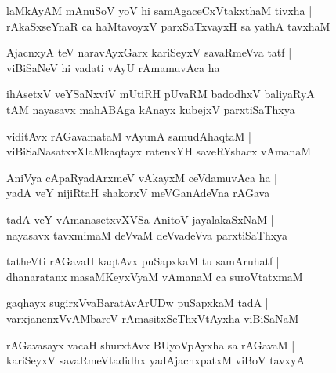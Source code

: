\begin{shloka}
laMkAyAM mAnuSoV yoV hi samAgaceCxVtakxthaM tivxha |\\
rAkaSxseYnaR ca haMtavoyxV parxSaTxvayxH sa yathA tavxhaM 
\end{shloka}

\begin{shloka}
AjacnxyA teV naravAyxGarx kariSeyxV savaRmeVva tatf |\\
viBiSaNeV hi vadati vAyU rAmamuvAca ha 
\end{shloka}

\begin{shloka}
ihAsetxV veYSaNxviV mUtiRH pUvaRM badodhxV baliyaRyA |\\
tAM nayasavx mahABAga kAnayx kubejxV parxtiSaThxya 
\end{shloka}

\begin{shloka}
viditAvx rAGavamataM vAyunA samudAhaqtaM |\\
viBiSaNasatxvXlaMkaqtayx ratenxYH saveRYshacx vAmanaM 
\end{shloka}

\begin{shloka}
AniVya cApaRyadArxmeV vAkayxM ceVdamuvAca ha |\\
yadA veY nijiRtaH shakorxV meVGanAdeVna rAGava 
\end{shloka}

\begin{shloka}
tadA veY vAmanasetxvXVSa AnitoV jayalakaSxNaM |\\
nayasavx tavxmimaM deVvaM deVvadeVva parxtiSaThxya
\end{shloka}

\begin{shloka}
tatheVti rAGavaH kaqtAvx puSapxkaM tu samAruhatf |\\
dhanaratanx masaMKeyxVyaM vAmanaM ca suroVtatxmaM
\end{shloka}

\begin{shloka}
gaqhayx sugirxVvaBaratAvArUDw puSapxkaM tadA |\\
varxjanenxVvAMbareV rAmasitxSeThxVtAyxha viBiSaNaM 
\end{shloka}

\begin{shloka}
rAGavasayx vacaH shurxtAvx BUyoVpAyxha sa rAGavaM |\\
kariSeyxV savaRmeVtadidhx yadAjacnxpatxM viBoV tavxyA 
\end{shloka}

